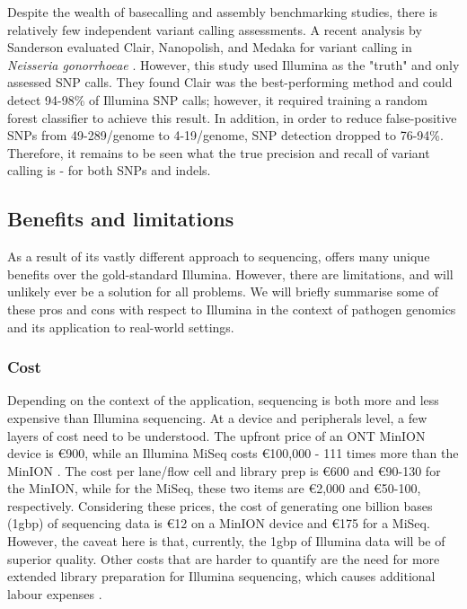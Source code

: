 Despite the wealth of \ont{} basecalling \cite{wick2019} and assembly \cite{wick2020} benchmarking studies, there is relatively few independent variant calling assessments. A recent analysis by Sanderson \etal{} evaluated Clair, Nanopolish, and Medaka for variant calling in \textit{Neisseria gonorrhoeae} \cite{sanderson2020}. However, this study used Illumina as the "truth" and only assessed SNP calls. They found Clair was the best-performing method and could detect 94-98\% of Illumina SNP calls; however, it required training a random forest classifier to achieve this result. In addition, in order to reduce false-positive SNPs from 49-289/genome to 4-19/genome, SNP detection dropped to 76-94\%. Therefore, it remains to be seen what the true precision and recall of \ont{} variant calling is - for both SNPs and indels.

\subsection{Benefits and limitations}
\label{sec:ont-benefits}

As a result of its vastly different approach to sequencing, \ont{} offers many unique benefits over the gold-standard Illumina. However, there are limitations, and \ont{} will unlikely ever be a solution for all problems. We will briefly summarise some of these pros and cons with respect to Illumina in the context of pathogen genomics and its application to real-world settings.

\subsubsection{Cost}
Depending on the context of the application, \ont{} sequencing is both more and less expensive than Illumina sequencing. At a device and peripherals level, a few layers of cost need to be understood. The upfront price of an ONT MinION device is \euro900, while an Illumina MiSeq costs \euro100,000 - 111 times more than the MinION \cite{Tedersoo2021}. The cost per lane/flow cell and library prep is \euro600 and \euro90-130 for the MinION, while for the MiSeq, these two items are \euro2,000 and \euro50-100, respectively. Considering these prices, the cost of generating one billion bases (1gbp) of sequencing data is \euro12 on a MinION device and \euro175 for a MiSeq. However, the caveat here is that, currently, the 1gbp of Illumina data will be of superior quality. Other costs that are harder to quantify are the need for more extended library preparation for Illumina sequencing, which causes additional labour expenses \cite{Tedersoo2021}.

